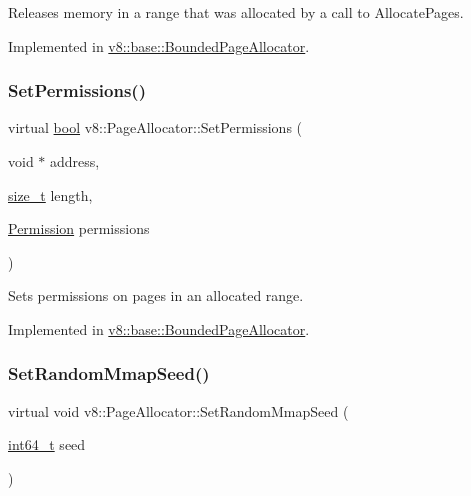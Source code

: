Releases memory in a range that was allocated by a call to Allocate\+Pages. 

Implemented in \mbox{\hyperlink{classv8_1_1base_1_1BoundedPageAllocator_abf47c5cae52f79c77bfc6bdcbcced44a}{v8\+::base\+::\+Bounded\+Page\+Allocator}}.

\mbox{\label{classv8_1_1PageAllocator_aa3817d5bfaba9ec280a6cfb60e6adda0}} 
\subsubsection{\texorpdfstring{Set\+Permissions()}{SetPermissions()}}
{\footnotesize\ttfamily virtual \mbox{\hyperlink{classbool}{bool}} v8\+::\+Page\+Allocator\+::\+Set\+Permissions (\begin{DoxyParamCaption}\item[{void $\ast$}]{address,  }\item[{\mbox{\hyperlink{classsize__t}{size\+\_\+t}}}]{length,  }\item[{\mbox{\hyperlink{classv8_1_1PageAllocator_a88f74b164fe97e053259f67a95758415}{Permission}}}]{permissions }\end{DoxyParamCaption})\hspace{0.3cm}{\ttfamily [pure virtual]}}

Sets permissions on pages in an allocated range. 

Implemented in \mbox{\hyperlink{classv8_1_1base_1_1BoundedPageAllocator_ae5b6f900d5722eb27be5eb376b8228a3}{v8\+::base\+::\+Bounded\+Page\+Allocator}}.

\mbox{\label{classv8_1_1PageAllocator_a9481a73527915fd200f6e1e9ed4b3eba}} 
\subsubsection{\texorpdfstring{Set\+Random\+Mmap\+Seed()}{SetRandomMmapSeed()}}
{\footnotesize\ttfamily virtual void v8\+::\+Page\+Allocator\+::\+Set\+Random\+Mmap\+Seed (\begin{DoxyParamCaption}\item[{\mbox{\hyperlink{classint64__t}{int64\+\_\+t}}}]{seed }\end{DoxyParamCaption})\hspace{0.3cm}{\ttfamily [pure virtual]}}

